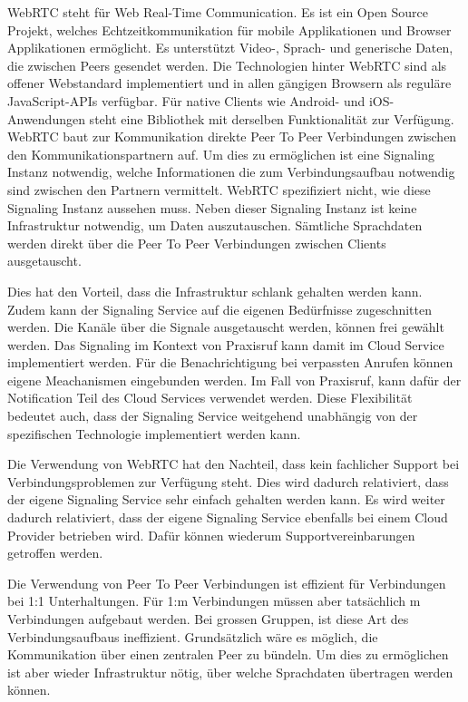 WebRTC steht für Web Real-Time Communication.
Es ist ein Open Source Projekt, welches Echtzeitkommunikation für mobile Applikationen und Browser Applikationen ermöglicht.
Es unterstützt Video-, Sprach- und generische Daten, die zwischen Peers gesendet werden.
Die Technologien hinter WebRTC sind als offener Webstandard implementiert und in allen gängigen Browsern als reguläre JavaScript-APIs verfügbar.
Für native Clients wie Android- und iOS-Anwendungen steht eine Bibliothek mit derselben Funktionalität zur Verfügung.\cite{webrtc}
WebRTC baut zur Kommunikation direkte Peer To Peer Verbindungen zwischen den Kommunikationspartnern auf.
Um dies zu ermöglichen ist eine Signaling Instanz notwendig, welche Informationen die zum Verbindungsaufbau notwendig sind zwischen den Partnern vermittelt.
WebRTC spezifiziert nicht, wie diese Signaling Instanz aussehen muss.
Neben dieser Signaling Instanz ist keine Infrastruktur notwendig, um Daten auszutauschen.
Sämtliche Sprachdaten werden direkt über die Peer To Peer Verbindungen zwischen Clients ausgetauscht.

Dies hat den Vorteil, dass die Infrastruktur schlank gehalten werden kann.
Zudem kann der Signaling Service auf die eigenen Bedürfnisse zugeschnitten werden.
Die Kanäle über die Signale ausgetauscht werden, können frei gewählt werden.
Das Signaling im Kontext von Praxisruf kann damit im Cloud Service implementiert werden.
Für die Benachrichtigung bei verpassten Anrufen können eigene Meachanismen eingebunden werden.
Im Fall von Praxisruf, kann dafür der Notification Teil des Cloud Services verwendet werden.
Diese Flexibilität bedeutet auch, dass der Signaling Service weitgehend unabhängig von der spezifischen Technologie implementiert werden kann.

Die Verwendung von WebRTC hat den Nachteil, dass kein fachlicher Support bei Verbindungsproblemen zur Verfügung steht.
Dies wird dadurch relativiert, dass der eigene Signaling Service sehr einfach gehalten werden kann.
Es wird weiter dadurch relativiert, dass der eigene Signaling Service ebenfalls bei einem Cloud Provider betrieben wird.
Dafür können wiederum Supportvereinbarungen getroffen werden.

Die Verwendung von Peer To Peer Verbindungen ist effizient für Verbindungen bei 1:1 Unterhaltungen.
Für 1:m Verbindungen müssen aber tatsächlich m Verbindungen aufgebaut werden.
Bei grossen Gruppen, ist diese Art des Verbindungsaufbaus ineffizient.
Grundsätzlich wäre es möglich, die Kommunikation über einen zentralen Peer zu bündeln.\cite{webrtc_mesh}
Um dies zu ermöglichen ist aber wieder Infrastruktur nötig, über welche Sprachdaten übertragen werden können.

